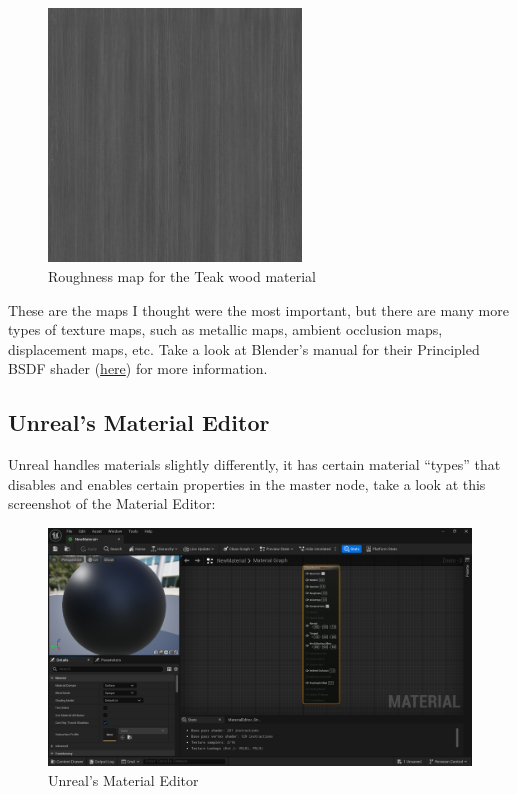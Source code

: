 \documentclass{article}
\begin{document}
\begin{figure}[!h]
    \centering
    \includegraphics[width=0.6\textwidth]{week1/Teak_4k_Roughness.jpg}
    \caption{Roughness map for the Teak wood material}
    \label{fig:roughness_map}
\end{figure}

\newpage

These are the maps I thought were the most important, but there are many more types of texture maps, such as metallic maps, ambient occlusion maps, displacement maps, etc. Take a look at Blender's manual for their Principled BSDF shader (\href{https://docs.blender.org/manual/en/4.0/render/shader_nodes/shader/principled.html#bpy-types-shadernodebsdfprincipled}{here}) for more information.

\subsection{Unreal's Material Editor}
Unreal handles materials slightly differently, it has certain material ``types'' that disables and enables certain properties in the master node, take a look at this screenshot of the Material Editor:

\begin{figure}[h]
    \centering
    \includegraphics[width=1\textwidth]{week1/image001.png}
    \caption{Unreal's Material Editor}
    \label{fig:unreal_material_editor}
\end{figure}
\end{document}
